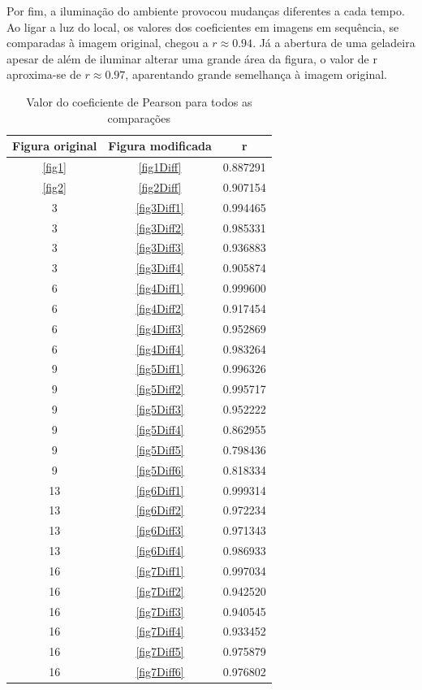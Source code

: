 \documentclass[10pt,a4paper]{article}
\begin{document}
Por fim, a iluminação do ambiente provocou mudanças diferentes a cada
tempo. Ao ligar a luz do local, os valores dos
coeficientes em imagens em sequência, se comparadas à imagem original, chegou a $r\approx 0.94 $. Já a
abertura de uma geladeira apesar de além de iluminar alterar uma grande área da
figura, o valor de r aproxima-se de $r\approx 0.97$, aparentando
grande semelhança à imagem original.

\begin{table}[h!]
  \begin{center}
    \caption{Valor do coeficiente de Pearson para todos as comparações}
    \begin{tabular}{|c|c|c|}
      \hline
      Figura original & Figura modificada & r\\
      \hline
      \ref{fig1} &  \ref{fig1Diff} &  0.887291 \\
      \ref{fig2} &  \ref{fig2Diff} &  0.907154\\
      3 &  \ref{fig3Diff1} & 0.994465\\
      3 & \ref{fig3Diff2} &  0.985331\\
      3 &  \ref{fig3Diff3} &  0.936883\\
      3 &  \ref{fig3Diff4} &  0.905874\\
      6 &  \ref{fig4Diff1} & 0.999600\\
      6 &  \ref{fig4Diff2} &  0.917454\\
      6 &  \ref{fig4Diff3} &   0.952869\\
      6 &  \ref{fig4Diff4} &   0.983264\\
      9 &  \ref{fig5Diff1} & 0.996326\\
      9 &  \ref{fig5Diff2} & 0.995717\\
      9 &  \ref{fig5Diff3} & 0.952222\\
      9 &  \ref{fig5Diff4} & 0.862955\\
      9 &  \ref{fig5Diff5} & 0.798436\\
      9 &  \ref{fig5Diff6} & 0.818334\\
      13 &  \ref{fig6Diff1} & 0.999314\\
      13 &  \ref{fig6Diff2} & 0.972234\\
      13 &  \ref{fig6Diff3} & 0.971343\\
      13 &  \ref{fig6Diff4} & 0.986933\\
      16 &  \ref{fig7Diff1} & 0.997034\\
      16 &  \ref{fig7Diff2} & 0.942520\\
      16 &  \ref{fig7Diff3} & 0.940545\\
      16 &  \ref{fig7Diff4} & 0.933452\\
      16 &  \ref{fig7Diff5} & 0.975879\\
      16 &  \ref{fig7Diff6} & 0.976802\\
      \hline
    \end{tabular}
  \end{center}\label{tab:final}
\end{table}
\end{document}
